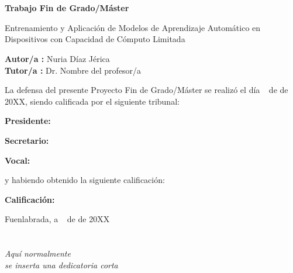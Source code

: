 \documentclass[a4paper, 12pt]{book}
\begin{document}
\newpage
\mbox{}
\thispagestyle{empty} %


\clearpage
{}
\chapter*{}

\vspace{-4cm}
\begin{center}
\LARGE
\textbf{Trabajo Fin de Grado/Máster}

\vspace{1cm}
\large
Entrenamiento y Aplicación de Modelos de Aprendizaje Automático en Dispositivos con Capacidad de Cómputo Limitada

\vspace{1cm}
\large
\textbf{Autor/a :} Nuria Díaz Jérica  \\
\textbf{Tutor/a :} Dr. Nombre del profesor/a

\end{center}

\vspace{1cm}
La defensa del presente Proyecto Fin de Grado/Máster se realizó el día \qquad$\;\,$ de
\qquad\qquad\qquad\qquad \newline de 20XX, siendo calificada por el siguiente tribunal:


\vspace{0.5cm}
\textbf{Presidente:}

\vspace{0.8cm}
\textbf{Secretario:}

\vspace{0.8cm}
\textbf{Vocal:}


\vspace{0.8cm}
y habiendo obtenido la siguiente calificación:

\vspace{0.8cm}
\textbf{Calificación:}


\vspace{0.8cm}
\begin{flushright}
Fuenlabrada, a \qquad$\;\,$ de \qquad\qquad\qquad\qquad de 20XX
\end{flushright}


\chapter*{}
\begin{flushright}
\textit{Aquí normalmente \\
se inserta una dedicatoria corta \\}
\end{flushright}
\end{document}
